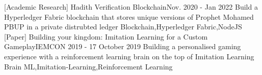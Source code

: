 

\begin{projects}
	


		\project
	{[Academic Research] Hadith Verification Blockchain}{Nov. 2020 - Jan 2022}
	{}
	{Build a Hyperledger Fabric blockchain that stores unique versions of Prophet Mohamed PBUP in a private distrubted ledger }
	{Blockchain,Hyperledger Fabric,NodeJS}	
			\project
	{[Paper] Building your kingdom: Imitation Learning for a Custom Gameplay}{IEMCON 2019 - 17 October 2019}
	{\paperSymbol{ }
	}
	{Building a personalised gaming experience with a reinforcement learning brain on the top of Imitation Learning Brain}
	{ML,Imitation-Learning,Reinforcement Learning}
\end{projects}
